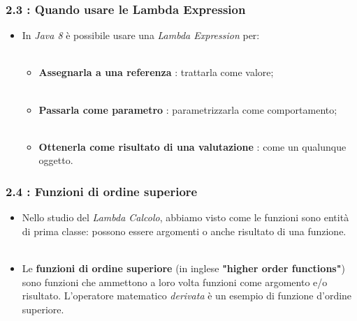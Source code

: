 \documentclass{beamer}
\begin{document}
\begin{frame}
	\frametitle{\textbf{2.3 : Quando usare le Lambda Expression}}
	\begin{itemize}
		\item
			In \textit{Java 8} \`e possibile usare una \textit{Lambda Expression} per:\\\
		\begin{itemize}
			\item
				\textbf{Assegnarla a una referenza} : trattarla come valore;\\\
			\item
				\textbf{Passarla come parametro} : parametrizzarla come comportamento;\\\
			\item
				\textbf{Ottenerla come risultato di una valutazione} : come un qualunque oggetto.
		\end{itemize}
	\end{itemize}
\end{frame}


\begin{frame}
	\frametitle{\textbf{2.4 : Funzioni di ordine superiore}}
	\begin{itemize}
		\item
			Nello studio del \textit{Lambda Calcolo}, abbiamo visto come le funzioni sono entità di prima classe: possono essere argomenti o anche risultato di una funzione.\\\
		\item
			Le \textbf{funzioni di ordine superiore} (in inglese \textbf{"higher order functions"}) sono funzioni che ammettono a loro volta funzioni come argomento e/o risultato. L'operatore matematico \emph{derivata} \`e un esempio di funzione d'ordine superiore.
	\end{itemize}
\end{frame}

\end{document}
